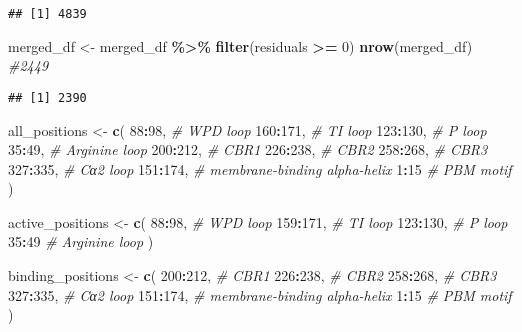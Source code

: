 \documentclass[
]{article}
\newenvironment{Shaded}{\begin{snugshade}}{\end{snugshade}}
\newcommand{\CommentTok}[1]{\textcolor[rgb]{0.56,0.35,0.01}{\textit{#1}}}
\newcommand{\DecValTok}[1]{\textcolor[rgb]{0.00,0.00,0.81}{#1}}
\newcommand{\FunctionTok}[1]{\textcolor[rgb]{0.13,0.29,0.53}{\textbf{#1}}}
\newcommand{\NormalTok}[1]{#1}
\newcommand{\OtherTok}[1]{\textcolor[rgb]{0.56,0.35,0.01}{#1}}
\newcommand{\SpecialCharTok}[1]{\textcolor[rgb]{0.81,0.36,0.00}{\textbf{#1}}}
\begin{document}
\begin{verbatim}
## [1] 4839
\end{verbatim}

\begin{Shaded}
\begin{Highlighting}[]
\NormalTok{merged\_df }\OtherTok{\textless{}{-}}\NormalTok{ merged\_df }\SpecialCharTok{\%\textgreater{}\%} \FunctionTok{filter}\NormalTok{(residuals }\SpecialCharTok{\textgreater{}=} \DecValTok{0}\NormalTok{)}
\FunctionTok{nrow}\NormalTok{(merged\_df) }\CommentTok{\#2449}
\end{Highlighting}
\end{Shaded}

\begin{verbatim}
## [1] 2390
\end{verbatim}

\begin{Shaded}
\begin{Highlighting}[]
\NormalTok{all\_positions }\OtherTok{\textless{}{-}} \FunctionTok{c}\NormalTok{(}
  \DecValTok{88}\SpecialCharTok{:}\DecValTok{98}\NormalTok{,    }\CommentTok{\# WPD loop}
  \DecValTok{160}\SpecialCharTok{:}\DecValTok{171}\NormalTok{,  }\CommentTok{\# TI loop}
  \DecValTok{123}\SpecialCharTok{:}\DecValTok{130}\NormalTok{,  }\CommentTok{\# P loop}
  \DecValTok{35}\SpecialCharTok{:}\DecValTok{49}\NormalTok{,    }\CommentTok{\# Arginine loop}
  \DecValTok{200}\SpecialCharTok{:}\DecValTok{212}\NormalTok{,  }\CommentTok{\# CBR1}
  \DecValTok{226}\SpecialCharTok{:}\DecValTok{238}\NormalTok{,  }\CommentTok{\# CBR2}
  \DecValTok{258}\SpecialCharTok{:}\DecValTok{268}\NormalTok{,  }\CommentTok{\# CBR3}
  \DecValTok{327}\SpecialCharTok{:}\DecValTok{335}\NormalTok{,   }\CommentTok{\# Cα2 loop}
  \DecValTok{151}\SpecialCharTok{:}\DecValTok{174}\NormalTok{, }\CommentTok{\# membrane{-}binding alpha{-}helix}
  \DecValTok{1}\SpecialCharTok{:}\DecValTok{15} \CommentTok{\# PBM motif }
\NormalTok{)}

\NormalTok{active\_positions }\OtherTok{\textless{}{-}} \FunctionTok{c}\NormalTok{(}
  \DecValTok{88}\SpecialCharTok{:}\DecValTok{98}\NormalTok{,    }\CommentTok{\# WPD loop}
  \DecValTok{159}\SpecialCharTok{:}\DecValTok{171}\NormalTok{,  }\CommentTok{\# TI loop}
  \DecValTok{123}\SpecialCharTok{:}\DecValTok{130}\NormalTok{,  }\CommentTok{\# P loop}
  \DecValTok{35}\SpecialCharTok{:}\DecValTok{49}   \CommentTok{\# Arginine loop}
\NormalTok{)}

\NormalTok{binding\_positions }\OtherTok{\textless{}{-}} \FunctionTok{c}\NormalTok{(}
  \DecValTok{200}\SpecialCharTok{:}\DecValTok{212}\NormalTok{,  }\CommentTok{\# CBR1}
  \DecValTok{226}\SpecialCharTok{:}\DecValTok{238}\NormalTok{,  }\CommentTok{\# CBR2}
  \DecValTok{258}\SpecialCharTok{:}\DecValTok{268}\NormalTok{,  }\CommentTok{\# CBR3}
  \DecValTok{327}\SpecialCharTok{:}\DecValTok{335}\NormalTok{,   }\CommentTok{\# Cα2 loop}
  \DecValTok{151}\SpecialCharTok{:}\DecValTok{174}\NormalTok{, }\CommentTok{\# membrane{-}binding alpha{-}helix}
  \DecValTok{1}\SpecialCharTok{:}\DecValTok{15} \CommentTok{\# PBM motif }
\NormalTok{)}
\end{Highlighting}
\end{Shaded}
\end{document}
